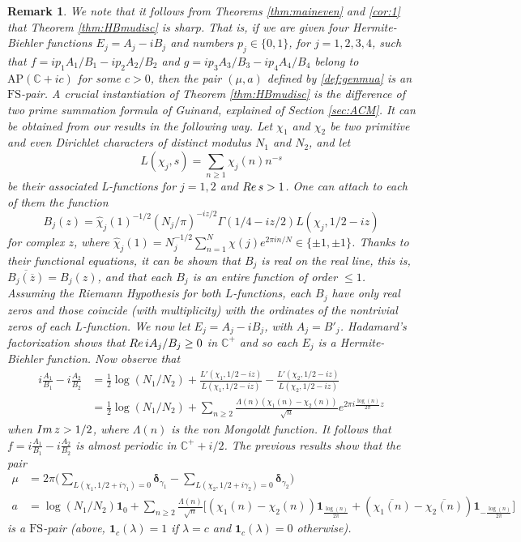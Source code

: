\documentclass[a4paper,reqno,12pt]{amsart}
\newtheorem{remark}{Remark}
\newcommand{\cp}{\mathbb{C}} %
\newcommand{\im}{{\rm Im}\,}
\newcommand{\re}{{\rm Re}\,}
\newcommand{\ft}{\widehat}
\newcommand{\bo}{\boldsymbol}
\newcommand{\la}{\lambda}
\newcommand{\ga}{\gamma}
\newcommand{\1}{{\bf 1}}
\newcommand{\fs}{\mathrm{FS}}
\newcommand{\ov}[1]{\overline{#1}}
\renewcommand{\1}{{\bo 1}}
\newcommand{\del}{{\bo \delta}}
\begin{document}
\begin{remark}\label{rem:genamu}
We note that it follows from Theorems \ref{thm:maineven} and \ref{cor:1} that Theorem \ref{thm:HBmudisc} is sharp. That is, if we are given four Hermite-Biehler functions $E_j=A_j-iB_j$ and numbers $p_j\in \{0,1\}$, for $j=1,2,3,4$, such that $f=ip_1A_1/B_1-ip_2A_2/B_2$ and $g=ip_3A_3/B_3-ip_4A_4/B_4$ belong to $\text{AP}(\cp+ic)$ for some $c>0$, then the pair $(\mu,a)$ defined by \eqref{def:genmua} is an $\fs$-pair. A crucial instantiation of Theorem \ref{thm:HBmudisc} is the difference of two prime summation formula of Guinand, explained of Section \ref{sec:ACM}. It can be obtained from our results in the following way. Let $\chi_1$ and $\chi_2$ be two primitive and even Dirichlet characters of distinct modulus $N_1$ and $N_2$, and let 
$$
L(\chi_j,s) = \sum_{n\geq 1} \chi_j(n)n^{-s}
$$
be their associated L-functions for $j=1,2$ and $\re s>1$. One can attach to each of them the function
$$
B_j(z)=\ft \chi_j(1)^{-1/2}(N_j/\pi)^{-iz/2}\Gamma(1/4-iz/2)L(\chi_j,1/2-iz)
$$
for complex $z$, where $\ft \chi_j(1)=N_j^{-1/2}\sum_{n=1}^N \chi(j)e^{2\pi i n/N} \in \{\pm 1, \pm 1\}$. Thanks to their functional equations, it can be shown that $B_j$ is real on the real line, this is, $\ov{B_j(\ov z)}=B_j(z)$, and that each $B_j$ is an entire function of order $\leq 1$. Assuming the Riemann Hypothesis for both $L$-functions, each $B_j$ have only real zeros and those coincide (with multiplicity) with the ordinates of the nontrivial zeros of each $L$-function. We now let $E_j=A_j-iB_j$, with $A_j=B'_j$. Hadamard's factorization shows that $ \re iA_j/B_j \geq 0$ in $\cp^+$ and so each $E_j$ is a Hermite-Biehler function. Now observe that
\begin{align*}
i\frac{A_1}{B_1} - i\frac{A_2}{B_2} & = \frac12\log(N_1/N_2) + \frac{L'(\chi_1,1/2-iz)}{L(\chi_1,1/2-iz)} - \frac{L'(\chi_2,1/2-iz)}{L(\chi_2,1/2-iz)}  \\ & = \frac12\log(N_1/N_2) + \sum_{n \geq 2} \frac{\Lambda(n)(\chi_1(n)-\chi_2(n))}{\sqrt{n}}e^{2\pi i \tfrac{\log(n)}{2\pi} z}
\end{align*}
when $\im z>1/2$, where $\Lambda(n)$ is the von Mongoldt function.
It follows that $f=i\frac{A_1}{B_1} - i\frac{A_2}{B_2}$ is almost periodic in $\cp^++i/2$. The previous results show that the pair
\begin{align*}
\mu & = 2\pi\bigg(\sum_{L(\chi_1,1/2+i\ga_1)=0} \del_{\ga_1}- \sum_{L(\chi_2,1/2+i\ga_2)=0} \del_{\ga_2}\bigg)
\\
a &= \log(N_1/N_2)\1_0 + \sum_{n\geq 2} \frac{\Lambda(n)}{\sqrt{n}}\bigg[(\chi_1(n)-\chi_2(n))\1_{\tfrac{\log(n)}{2\pi}} + (\ov{\chi_1(n)}-\ov{\chi_2(n)})\1_{-\tfrac{\log(n)}{2\pi}}\bigg]
\end{align*}
is a $\fs$-pair (above, $\1_c(\la)=1$ if $\la=c$ and $\1_c(\la)=0$ otherwise).
\end{remark}
\end{document}
